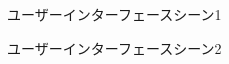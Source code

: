 \begin{figure}[htbp]
    \begin{center}
    \end{center}
    \caption{ユーザーインターフェースシーン1}
    \label{fig:seen1}
\end{figure}

\begin{figure}[htbp]
    \begin{center}
    \end{center}
    \caption{ユーザーインターフェースシーン2}
    \label{fig:seen2}
\end{figure}

